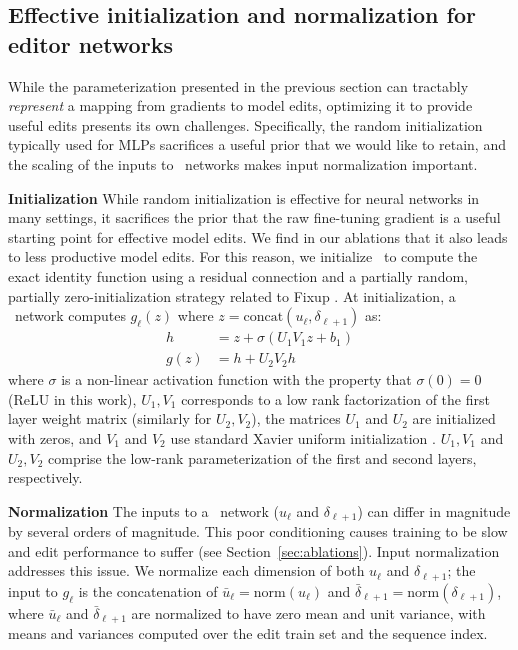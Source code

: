 \documentclass{article}
\begin{document}
\subsection{Effective initialization and normalization for editor networks}
While the parameterization presented in the previous section can tractably \textit{represent} a mapping from gradients to model edits, optimizing it to provide useful edits presents its own challenges. Specifically, the random initialization typically used for MLPs sacrifices a useful prior that we would like to retain, and the scaling of the inputs to \name~networks makes input normalization important.



\textbf{Initialization} While random initialization is effective for neural networks in many settings, it sacrifices the prior that the raw fine-tuning gradient is a useful starting point for effective model edits. We find in our ablations that it also leads to less productive model edits. For this reason, we initialize \name~to compute the exact identity function using a residual connection \citep{he2016deep} and a partially random, partially zero-initialization strategy related to Fixup \citep{zhang2018residual}. At initialization, a \name~network computes $g_\ell(z)$ where $z=\text{concat}(u_\ell, \delta_{\ell+1})$ as:
\begin{align}
    h &= z + \sigma(U_1V_1 z + b_1) \\
    g(z) &= h + U_2V_2 h
\end{align}
where $\sigma$ is a non-linear activation function with the property that $\sigma(0) = 0$ (ReLU in this work), $U_1,V_1$ corresponds to a low rank factorization of the first layer weight matrix (similarly for $U_2,V_2$), the matrices $U_1$ and $U_2$ are initialized with zeros, and $V_1$ and $V_2$ use standard Xavier uniform initialization \citep{pmlr-v9-glorot10a}. $U_1,V_1$ and $U_2,V_2$ comprise the low-rank parameterization of the first and second layers, respectively.

\textbf{Normalization} The inputs to a \name~network ($u_\ell$ and $\delta_{\ell+1}$) can differ in magnitude by several orders of magnitude. This poor conditioning causes training to be slow and edit performance to suffer (see Section~\ref{sec:ablations}). Input normalization addresses this issue. We normalize each dimension of both $u_\ell$ and $\delta_{\ell+1}$; the input to $g_\ell$ is the concatenation of $\bar{u}_\ell=\text{norm}(u_\ell)$ and $\bar{\delta}_{\ell+1} = \text{norm}(\delta_{\ell+1})$, where $\bar{u}_\ell$ and $\bar{\delta}_{\ell+1}$ are normalized to have zero mean and unit variance, with means and variances computed over the edit train set and the sequence index.
\end{document}
